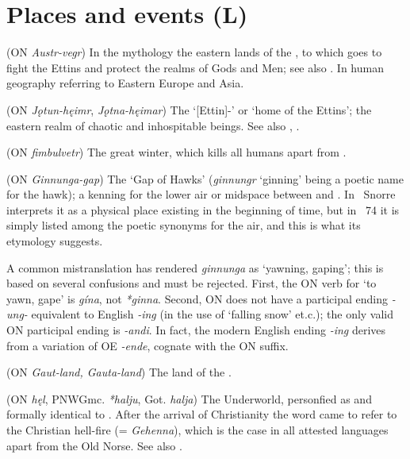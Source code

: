 \section{Places and events (L)}
\begin{itemize}

 (ON \emph{Austr-vegr})
  In the mythology the eastern lands of the , to which  goes to fight the Ettins and protect the realms of Gods and Men; see also .  In human geography referring to Eastern Europe and Asia.

 (ON \emph{Jǫtun-hęimr}, \emph{Jǫtna-hęimar})
  The ‘[Ettin]-’ or ‘home of the Ettins’; the eastern realm of chaotic and inhospitable beings.  See also , .

 (ON \emph{fimbulvetr})
  The great winter, which kills all humans apart from .

 (ON \emph{Ginnunga-gap})
  The ‘Gap of Hawks’ (\emph{ginnungr} ‘ginning’ being a poetic name for the hawk); a kenning for the lower air or midspace between  and .  In \Gylfaginning\ Snorre interprets it as a physical place existing in the beginning of time, but in \Skaldskaparmal\ 74 it is simply listed among the poetic synonyms for the air, and this is what its etymology suggests.

  A common mistranslation has rendered \emph{ginnunga} as ‘yawning, gaping’; this is based on several confusions and must be rejected.  First, the ON verb for ‘to yawn, gape’ is \emph{gína}, not \emph{*ginna}.  Second, ON does not have a participal ending \emph{-ung-} equivalent to English \emph{-ing} (in the use of ‘falling snow’ et.c.); the only valid ON participal ending is \emph{-andi}.  In fact, the modern English ending \emph{-ing} derives from a variation of OE \emph{-ende}, cognate with the ON suffix.

 (ON \emph{Gaut-land, Gauta-land})
  The land of the .

 (ON \emph{hęl}, PNWGmc. \emph{*halju}, Got. \emph{halja})
  The Underworld, personfied as and formally identical to .  After the arrival of Christianity the word came to refer to the Christian hell-fire (= \emph{Gehenna}), which is the case in all attested languages apart from the Old Norse.  See also .


\end{itemize}
